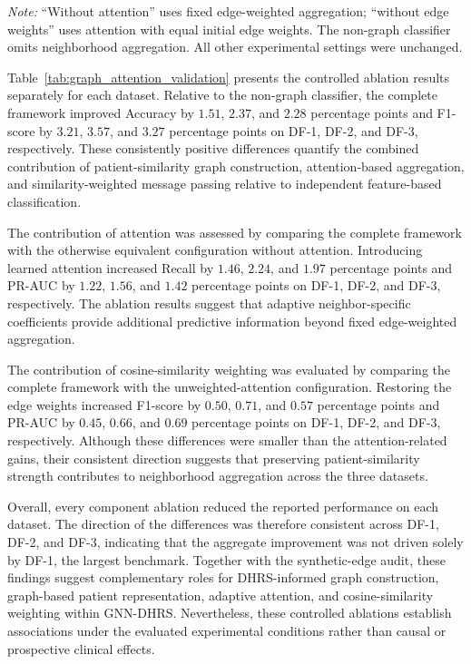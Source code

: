 \documentclass[pdflatex,sn-mathphys-num]{sn-jnl}%
\theoremstyle{thmstyleone}%
\theoremstyle{thmstyletwo}%
\theoremstyle{thmstylethree}%
\begin{document}
\begin{table}[!ht]
{\begin{tabular}{@{}llccccc@{}}
\bottomrule
\end{tabular}%
}

\vspace{2pt}
\begin{minipage}{0.98\textwidth}
\footnotesize
\textit{Note:} ``Without attention'' uses fixed edge-weighted aggregation;
``without edge weights'' uses attention with equal initial edge weights. The
non-graph classifier omits neighborhood aggregation. All other experimental
settings were unchanged.
\end{minipage}
\end{table}
\endgroup

 {
Table~\ref{tab:graph_attention_validation} presents the controlled ablation
results separately for each dataset. Relative to the non-graph classifier,
the complete framework improved Accuracy by \(1.51\), \(2.37\), and \(2.28\)
percentage points and F1-score by \(3.21\), \(3.57\), and \(3.27\) percentage
points on DF-1, DF-2, and DF-3, respectively. These consistently positive
differences quantify the combined contribution of patient-similarity graph
construction, attention-based aggregation, and similarity-weighted message
passing relative to independent feature-based classification.
}

 {
The contribution of attention was assessed by comparing the complete
framework with the otherwise equivalent configuration without attention.
Introducing learned attention increased Recall by \(1.46\), \(2.24\), and
\(1.97\) percentage points and PR-AUC by \(1.22\), \(1.56\), and \(1.42\)
percentage points on DF-1, DF-2, and DF-3, respectively. The ablation results
suggest that adaptive neighbor-specific coefficients provide additional
predictive information beyond fixed edge-weighted aggregation.
}

 {
The contribution of cosine-similarity weighting was evaluated by comparing
the complete framework with the unweighted-attention configuration. Restoring
the edge weights increased F1-score by \(0.50\), \(0.71\), and \(0.57\)
percentage points and PR-AUC by \(0.45\), \(0.66\), and \(0.69\) percentage
points on DF-1, DF-2, and DF-3, respectively. Although these differences were
smaller than the attention-related gains, their consistent direction suggests
that preserving patient-similarity strength contributes to neighborhood
aggregation across the three datasets.
}

 {
Overall, every component ablation reduced the reported performance on each
dataset. The direction of the differences was therefore consistent across
DF-1, DF-2, and DF-3, indicating that the aggregate improvement was not
driven solely by DF-1, the largest benchmark. Together with the
synthetic-edge audit, these findings suggest complementary roles for
DHRS-informed graph construction, graph-based patient representation,
adaptive attention, and cosine-similarity weighting within GNN-DHRS.
Nevertheless, these controlled ablations establish associations under the
evaluated experimental conditions rather than causal or prospective clinical
effects.
}
\end{document}
